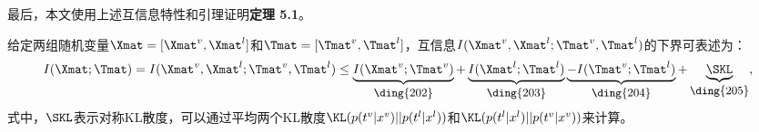 最后，本文使用上述互信息特性和引理证明\textbf{定理 5.1}。

\begin{theorem}
给定两组随机变量$\Xmat=[\Xmat^v, \Xmat^l]$和$\Tmat=[\Tmat^v, \Tmat^l]$，互信息$I(\Xmat^v, \Xmat^l; \Tmat^v, \Tmat^l)$的下界可表述为：
\begin{equation}
\begin{aligned}
I(\Xmat; \Tmat) = I(\Xmat^v, \Xmat^l; \Tmat^v, \Tmat^l) \le \underbrace{I(\Xmat^v; \Tmat^v)}_{\text{\small{\ding{202}}}} + \underbrace{I(\Xmat^l; \Tmat^l)}_{\text{\small{\ding{203}}}} \underbrace{- I(\Tmat^v; \Tmat^l)}_{\text{\small{\ding{204}}}} + \underbrace{\SKL}_{\text{\small{\ding{205}}}}, 
\end{aligned}
\label{eq:JMI}
\end{equation}
式中，$\SKL$表示对称KL散度，可以通过平均两个KL散度$\KL(p(t^v|x^v)||p(t^l|x^l))$和$\KL(p(t^l|x^l)||p(t^v|x^v))$来计算。
\end{theorem}
